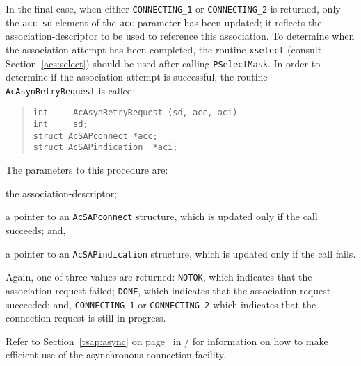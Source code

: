 In the final case, when either \verb"CONNECTING_1" or
\verb"CONNECTING_2" is returned,
only the \verb"acc_sd" element of the \verb"acc" parameter has been updated;
it reflects the association-descriptor to be used to reference this
association.
To determine when the association attempt has been completed,
the routine \verb"xselect" (consult Section~\ref{acs:select})
should be used after calling \verb"PSelectMask".
In order to determine if the association attempt is successful,
the routine \verb"AcAsynRetryRequest" is called:
\begin{quote}\small\begin{verbatim}
int     AcAsynRetryRequest (sd, acc, aci)
int     sd;
struct AcSAPconnect *acc;
struct AcSAPindication  *aci;
\end{verbatim}\end{quote}
The parameters to this procedure are:
\begin{describe}
\item[\verb"sd":] the association-descriptor;

\item[\verb"acc":] a pointer to an \verb"AcSAPconnect" structure, which is
updated only if the call succeeds;
and,

\item[\verb"aci":] a pointer to an \verb"AcSAPindication" structure, which is
updated only if the call fails.
\end{describe}
Again, one of three values are returned:
\verb"NOTOK", which indicates that the association request failed;
\verb"DONE", which indicates that the association request succeeded;
and, \verb"CONNECTING_1" or \verb"CONNECTING_2" which indicates that
the connection request is still in progress.

Refer to Section~\ref{tsap:async} on page~\pageref{tsap:async} in \voltwo/
for information on how to make efficient use of the asynchronous connection
facility. 

